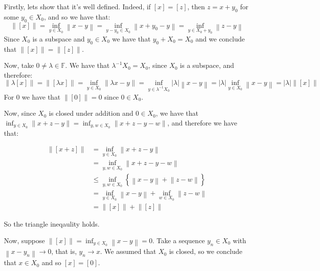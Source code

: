 \documentclass[11pt]{article} %
\newcommand{\norm}[1]{\left\lVert#1\right\rVert}
\begin{document}
\begin{Answer}
Firstly, lets show that it's well defined. Indeed, if $\left[x\right] = \left[z\right]$, then $z = x + y_0$ for some $y_0 \in X_0$, and so we have that:
\[ \norm{\left[ x \right]} = \inf_{y\in X_0}\norm{x -y} = \inf_{y - y_0\in X_0}\norm{x + y_0 - y} = \inf_{y \in X_0 + y_0}\norm{z - y} \]
Since $X_0$ is a subspace and $y_0 \in X_0$ we have that $y_0 + X_0 = X_0$ and we conclude that $\norm{\left[x\right]} = \norm{\left[z\right]}$.

Now, take $0 \neq \lambda \in \mathbb{F}$. We have that $\lambda^{-1} X_0 = X_0$, since $X_0$ is a subspace, and therefore:
\[ \norm{\lambda \left[ x \right]} = \norm{ \left[ \lambda x \right]} = \inf_{y\in X_0} \norm{ \lambda x -y} = \inf_{y \in \lambda^{-1} X_0} \left| \lambda \right| \norm{x -y} = \left| \lambda \right| \inf_{y \in X_0} \norm{x - y} = \left| \lambda \right| \norm{\left[x \right]} \]
For $0$ we have that $\norm{\left[0\right]} = 0$ since $0 \in X_0$.

Now, since $X_0$ is closed under addition and $0 \in X_0$, we have that $\inf_{y\in X_0}\norm{x + z - y} = \inf_{y,w\in X_0}\norm{x + z - y - w}$, and therefore we have that:

\begin{equation}
\begin{split}
\norm{\left[x + z\right]} & = \inf_{y\in X_0}\norm{x + z - y} \\
& = \inf_{y,w\in X_0}\norm{x + z - y - w} \\
& \leq \inf_{y,w\in X_0} \left\{ \norm{x - y} + \norm{z - w}\right\} \\
& = \inf_{y\in X_0}\norm{x-y} + \inf_{w \in X_0}\norm{z-w} \\
& = \norm{\left[x\right]} + \norm{\left[z\right]}
\end{split}
\end{equation}

So the triangle ineqaulity holds.

Now, suppose $\norm{\left[x\right]}  = \inf_{y \in X_0}\norm{x - y} =0$. Take a sequence $y_n \in X_0$ with $\norm{x - y_n} \to 0$, that is, $y_n \to x$. We assumed that $X_0$ is closed, so we conclude that $x\in X_0$ and so $\left[x\right] = \left[0\right]$.

\end{Answer}
\end{document}

